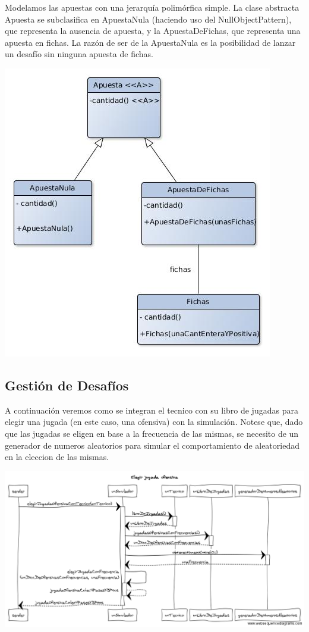 Modelamos las apuestas con una jerarquía polimórfica simple. La clase abstracta Apuesta se subclasifica en ApuestaNula (haciendo uso del NullObjectPattern), que representa la ausencia de apuesta, y la ApuestaDeFichas, que representa una apuesta en fichas. La razón de ser de la ApuestaNula es la posibilidad de lanzar un desafío sin ninguna apuesta de fichas.\\
\begin{center}
\includegraphics[scale=0.4]{diseno/apuestas.jpg}
\end{center}

\subsection{Gestión de Desafíos}



A continuación veremos como se integran el tecnico con su libro de jugadas para elegir una jugada (en este caso, una ofensiva) con la simulación. Notese que, dado que las jugadas se eligen en base a la frecuencia de las mismas, se necesito de un generador de numeros aleatorios para simular el comportamiento de aleatoriedad en la eleccion de las mismas.
\begin{center}
\includegraphics[scale=0.30]{diseno/Elegir_jugada_ofensiva.png} 
\end{center}


